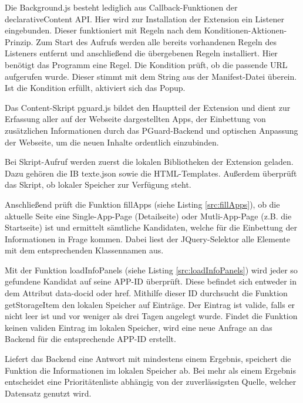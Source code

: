 

Die Background.js besteht lediglich aus Callback-Funktionen der declarativeContent API. Hier wird zur Installation der Extension ein Listener eingebunden. Dieser funktioniert mit Regeln nach dem Konditionen-Aktionen-Prinzip. Zum Start des Aufrufs werden alle bereits vorhandenen Regeln des Listeners entfernt und anschließend die übergebenen Regeln installiert.
Hier benötigt das Programm eine Regel. Die Kondition prüft, ob die passende URL aufgerufen wurde. Dieser stimmt mit dem String aus der Manifest-Datei überein. Ist die Kondition erfüllt, aktiviert sich das Popup.

Das Content-Skript \glqq pguard.js \grqq{} bildet den Hauptteil der Extension und dient zur Erfassung aller auf der Webseite dargestellten Apps, der Einbettung von zusätzlichen Informationen durch das PGuard-Backend und optischen Anpassung der Webseite, um die neuen Inhalte ordentlich einzubinden.

Bei Skript-Aufruf werden zuerst die lokalen Bibliotheken der Extension geladen. Dazu gehören die IB texte.json sowie die HTML-Templates. Außerdem überprüft das Skript, ob lokaler Speicher zur Verfügung steht.

Anschließend prüft die Funktion \glqq fillApps\grqq{} (siehe Listing \ref{src:fillApps}), ob die aktuelle Seite eine Single-App-Page (Detailseite) oder Mutli-App-Page (z.B. die Startseite) ist und ermittelt sämtliche Kandidaten, welche für die Einbettung der Informationen in Frage kommen. Dabei liest der JQuery-Selektor alle Elemente mit dem entsprechenden Klassennamen aus.

Mit der Funktion \glqq loadInfoPanels\grqq{} (siehe Listing \ref{src:loadInfoPanels}) wird jeder so gefundene Kandidat auf seine APP-ID überprüft. Diese befindet sich entweder in dem Attribut \glqq data-docid\grqq{} oder \glqq href\grqq{}. Mithilfe dieser ID durchsucht die Funktion \glqq getStorageItem\grqq{} den lokalen Speicher auf Einträge. Der  Eintrag ist valide, falls er nicht leer ist und vor weniger als drei Tagen angelegt wurde. Findet die Funktion keinen validen Eintrag im lokalen Speicher, wird eine neue Anfrage an das Backend für die entsprechende APP-ID erstellt.

Liefert das Backend eine Antwort mit mindestens einem Ergebnis, speichert die Funktion die Informationen im lokalen Speicher ab. Bei mehr als einem Ergebnis entscheidet eine Prioritätenliste abhängig von der zuverlässigsten Quelle, welcher Datensatz genutzt wird.

